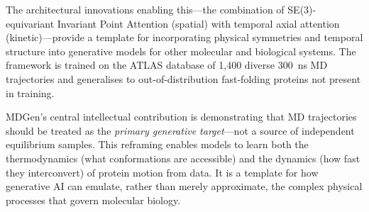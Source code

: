 \documentclass[11pt,a4paper]{article}
\begin{document}
The architectural innovations enabling this---the combination of SE(3)-equivariant Invariant Point
Attention (spatial) with temporal axial attention (kinetic)---provide a template for incorporating
physical symmetries and temporal structure into generative models for other molecular and
biological systems.  The framework is trained on the ATLAS database of 1,400 diverse 300~ns MD
trajectories and generalises to out-of-distribution fast-folding proteins not present in training.

MDGen's central intellectual contribution is demonstrating that MD trajectories should be treated
as the \emph{primary generative target}---not a source of independent equilibrium samples.  This
reframing enables models to learn both the thermodynamics (what conformations are accessible) and
the dynamics (how fast they interconvert) of protein motion from data.  It is a template for how
generative AI can emulate, rather than merely approximate, the complex physical processes that
govern molecular biology.
\end{document}
